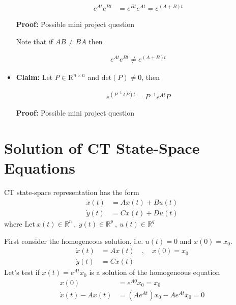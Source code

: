 \documentclass[twoside]{article}
\begin{document}
\begin{itemize}
\begin{align*}
	e^{A t} e^{B t} &= e^{B t} e^{A t} = e^{(A + B) t} 
\end{align*}

\textbf{Proof:} Possible mini project question

\par 

Note that if $A B \neq B A$ then

\begin{align*}
	e^{A t} e^{B t} \neq e^{(A + B) t} 
\end{align*}

\item \textbf{Claim:} Let $P \in \mathrm{R}^{n \times n}$ and
 $\mathrm{det}(P) \neq 0$, then

\begin{align*}
	e^{\left(P^{-1} A P \right) t} = P^{-1} e^{A t} P
\end{align*}

\textbf{Proof:} Possible mini project question

\end{itemize}

\section*{Solution of CT State-Space Equations}

CT state-space representation has the form
%
\begin{align*}
  \dot{x}(t) &= A x(t) + B u(t)
\\
 \dot{y}(t) &= C x(t) + D u(t)
\end{align*}
%
where $\mathrm{Let} \ x(t) \in \mathbb{R}^n \ , \ y(t) \in \mathbb{R}^p \ ,\  u(t) \in
  \mathbb{R}^q$

First consider the homogeneous solution, i.e. $u(t) = 0$ and $x(0) =
x_0$.
%
\begin{align*}
  \dot{x}(t) &= A x(t) \quad , \quad x(0) = x_0
\\
 \dot{y}(t) &= C x(t) 
\end{align*}
%
Let's test if $x(t) = e^{A t} x_0$ is a solution of the homogeneous 
equation
%
%
\begin{align*}
  x(0) &= e^{A 0} x_0 = x_0
  \\
  \dot{x}(t) - A x(t) &= \left( A e^{At} \right) x_0 - A e^{At} x_0 = 0
\end{align*}
%
\end{document}
